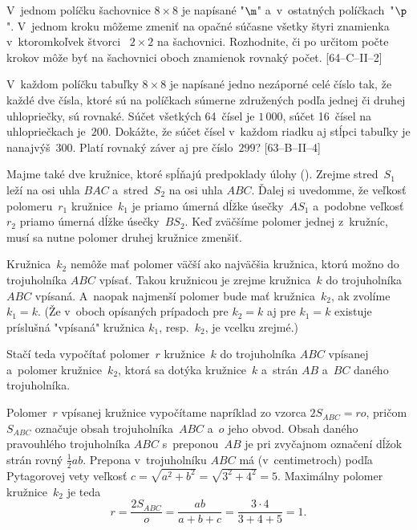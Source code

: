 {\D
V~jednom políčku šachovnice $8\times8$ je napísané "$\m$" a~v~ostatných políčkach~"$\p$".
V~jednom kroku môžeme zmeniť na opačné súčasne všetky štyri znamienka v~ktoromkoľvek štvorci~
$2\times2$ na šachovnici. Rozhodnite, či po určitom počte krokov môže
byť na šachovnici oboch znamienok rovnaký počet. [64--C--II--2]

V~každom políčku tabuľky $8\times8$ je napísané jedno nezáporné celé číslo tak, že každé
dve čísla, ktoré sú na políčkach súmerne združených podľa jednej či druhej uhlopriečky, sú
rovnaké. Súčet všetkých 64~čísel je $1\,000$, súčet 16~čísel na uhlopriečkach je~$200$. Dokážte, že
súčet čísel v~každom riadku aj stĺpci tabuľky je nanajvýš~$300$. Platí rovnaký záver aj pre číslo~$299$? [63--B--II--4]
}

{%
Majme také dve kružnice, ktoré spĺňajú predpoklady úlohy (\obr).
Zrejme stred~$S_1$ leží na osi uhla $BAC$ a~stred~$S_2$ na osi uhla $ABC$.
%
Ďalej si uvedomme, že veľkosť polomeru~$r_1$ kružnice~$k_1$ je priamo
úmerná dĺžke úsečky~$AS_1$ a~podobne veľkosť~$r_2$ priamo úmerná
dĺžke úsečky~$BS_2$. Keď zväčšíme polomer jednej z~kružníc, musí sa
nutne polomer druhej kružnice zmenšiť.

Kružnica~$k_2$ nemôže mať polomer väčší ako najväčšia kružnica, ktorú
možno do trojuholníka $ABC$ vpísať. Takou kružnicou je zrejme kružnica~$k$
do trojuholníka $ABC$ vpísaná. A~naopak najmenší polomer bude mať kružnica~$k_2$,
ak zvolíme $k_1=k$. (Že v~oboch opísaných prípadoch pre $k_2=k$ aj pre $k_1=k$
existuje príslušná "vpísaná" kružnica $k_1$, resp.~$k_2$, je vcelku zrejmé.)

Stačí teda vypočítať polomer~$r$ kružnice~$k$ do trojuholníka $ABC$ vpísanej
a~polomer kružnice~$k_2$, ktorá sa dotýka kružnice~$k$ a~strán $AB$ a~$BC$
daného trojuholníka.

Polomer~$r$ vpísanej kružnice vypočítame napríklad zo vzorca $2S_{ABC} =ro$, pričom
$S_{ABC}$ označuje obsah trojuholníka~$ABC$ a~$o$ jeho obvod.
Obsah daného pravouhlého trojuholníka $ABC$
s~preponou~$AB$ je pri zvyčajnom označení dĺžok strán rovný $\frac12ab$.
Prepona v~trojuholníku $ABC$ má (v~centimetroch) podľa Pytagorovej vety veľkosť
$c = \sqrt {a^2+b^2} = \sqrt {3^2+4^2} = 5$. Maximálny polomer kružnice~$k_2$
je teda
$$
r = \frac {2S_{ABC}} o= \frac {ab} {a+b+c} = \frac {3 \cdot 4} {3+4+5} = 1.
$$

}
